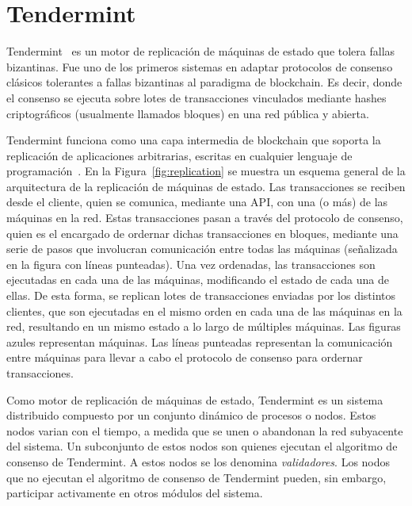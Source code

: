 

\section{Tendermint}\label{sec:tendermint}
Tendermint~\cite{Buchman.2018.Tendermint} es un motor de replicación de máquinas de estado que tolera fallas bizantinas. 
%
Fue uno de los primeros sistemas en adaptar protocolos de consenso clásicos tolerantes a fallas bizantinas
al paradigma de blockchain.
%
Es decir, donde el consenso se ejecuta sobre lotes de transacciones vinculados mediante
hashes criptográficos (usualmente llamados bloques) en una red pública y abierta.

Tendermint funciona como una capa intermedia de blockchain que soporta la replicación de aplicaciones arbitrarias,
escritas en cualquier lenguaje de programación~\cite{tendermint.design}.
%
En la Figura~\ref{fig:replication} se muestra un esquema general de la arquitectura de la replicación de máquinas de
estado.
%
Las transacciones se reciben desde el cliente, quien se comunica, mediante una API, con una (o más) de las máquinas
en la red.
%
Estas transacciones pasan a través del protocolo de consenso, quien es el encargado de ordernar dichas
transacciones en bloques, mediante una serie de pasos que involucran comunicación entre todas las máquinas
(señalizada en la figura con líneas punteadas).
%
Una vez ordenadas, las transacciones son ejecutadas en cada una de las máquinas, modificando el estado
de cada una de ellas.
%
De esta forma, se replican lotes de transacciones enviadas por los distintos clientes, que son ejecutadas en el mismo
orden en cada una de las máquinas en la red, resultando en un mismo estado a lo largo de múltiples máquinas.
%
Las figuras azules representan máquinas.
%
Las líneas punteadas representan la comunicación entre máquinas para llevar a cabo el protocolo de consenso para ordernar
transacciones.

Como motor de replicación de máquinas de estado, Tendermint es un sistema distribuido compuesto por un conjunto
dinámico de procesos o nodos.
%
Estos nodos varian con el tiempo, a medida que se unen o abandonan la red subyacente del sistema.
%
Un subconjunto de estos nodos son quienes ejecutan el algoritmo de consenso de Tendermint.
%
A estos nodos se los denomina \textit{validadores}.
%
Los nodos que no ejecutan el algoritmo de consenso de Tendermint pueden, sin embargo, participar
activamente en otros módulos del sistema.


